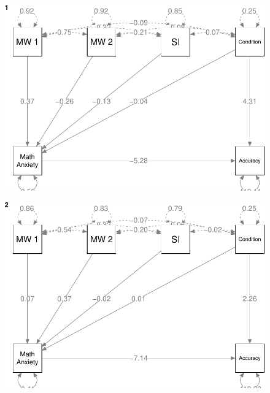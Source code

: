 \documentclass[
  letterpaper,
  DIV=11,
  numbers=noendperiod]{scrartcl}
\begin{document}
\begin{figure}[H]

{\centering \includegraphics{sampling_files/figure-pdf/unnamed-chunk-41-1.pdf}

}

\end{figure}

\begin{figure}[H]

{\centering \includegraphics{sampling_files/figure-pdf/unnamed-chunk-41-2.pdf}

}

\end{figure}
\end{document}
